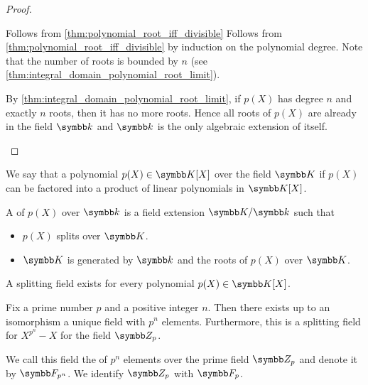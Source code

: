 \begin{proof}
\begin{description}
     Follows from \cref{thm:polynomial_root_iff_divisible} Follows from \cref{thm:polynomial_root_iff_divisible} by induction on the polynomial degree. Note that the number of roots is bounded by \( n \) (see \cref{thm:integral_domain_polynomial_root_limit}).

     By \cref{thm:integral_domain_polynomial_root_limit}, if \( p(X) \) has degree \( n \) and exactly \( n \) roots, then it has no more roots. Hence all roots of \( p(X) \) are already in the field \( \Kl \) and \( \Kl \) is the only algebraic extension of itself.
  \end{description}
\end{proof}

\begin{definition}\label{def:splitting_field}\cite[458]{Knapp2016BAlg}
  We say that a polynomial \( p(X) \in \K[X] \) over the field \( \K \)  if \( p(X) \) can be factored into a product of linear polynomials in \( \K[X] \).

  A  of \( p(X) \) over \( \Kl \) is a field extension \( \K / \Kl \) such that
  \begin{itemize}
    \item \( p(X) \) splits over \( \K \).
    \item \( \K \) is generated by \( \Kl \) and the roots of \( p(X) \) over \( \K \).
  \end{itemize}
\end{definition}

\begin{proposition}\label{thm:splitting_field_existence}\cite[theorem 9.12]{Knapp2016BAlg}
  A splitting field exists for every polynomial \( p(X) \in \K[X] \).
\end{proposition}

\begin{theorem}\label{thm:galois_field_existence}\cite[theorem 9.14]{Knapp2016BAlg}
  Fix a prime number \( p \) and a positive integer \( n \). Then there exists up to an isomorphism a unique field with \( p^n \) elements. Furthermore, this is a splitting field for \( X^{p^n} - X \) for the field \( \Z_p \).

  We call this field the  of \( p^n \) elements over the prime field \( \Z_p \) and denote it by
  \( \F_{p^n} \). We identify \( \Z_p \) with \( \F_p \).
\end{theorem}

